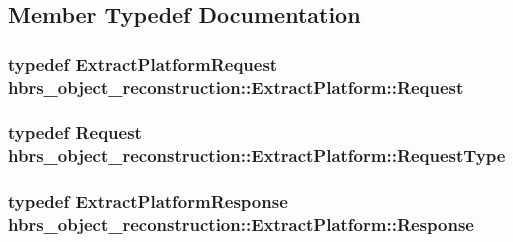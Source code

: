 \subsection{\-Member \-Typedef \-Documentation}
\hypertarget{structhbrs__object__reconstruction_1_1_extract_platform_a20caf0ee2df329f57f79fb57560020d7}{
\subsubsection[{\-Request}]{\setlength{\rightskip}{0pt plus 5cm}typedef {\bf \-Extract\-Platform\-Request} {\bf hbrs\-\_\-object\-\_\-reconstruction\-::\-Extract\-Platform\-::\-Request}}}\label{structhbrs__object__reconstruction_1_1_extract_platform_a20caf0ee2df329f57f79fb57560020d7}
\hypertarget{structhbrs__object__reconstruction_1_1_extract_platform_a2532e833420e31a667c0f947c0903957}{
\subsubsection[{\-Request\-Type}]{\setlength{\rightskip}{0pt plus 5cm}typedef {\bf \-Request} {\bf hbrs\-\_\-object\-\_\-reconstruction\-::\-Extract\-Platform\-::\-Request\-Type}}}\label{structhbrs__object__reconstruction_1_1_extract_platform_a2532e833420e31a667c0f947c0903957}
\hypertarget{structhbrs__object__reconstruction_1_1_extract_platform_ad428e95b416f00284f5445b5771d2046}{
\subsubsection[{\-Response}]{\setlength{\rightskip}{0pt plus 5cm}typedef {\bf \-Extract\-Platform\-Response} {\bf hbrs\-\_\-object\-\_\-reconstruction\-::\-Extract\-Platform\-::\-Response}}}\label{structhbrs__object__reconstruction_1_1_extract_platform_ad428e95b416f00284f5445b5771d2046}
